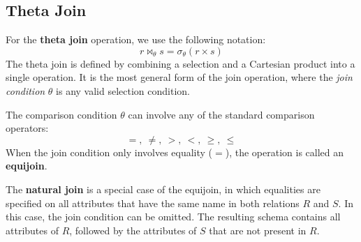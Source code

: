 \subsection{Theta Join}
For the \textbf{theta join} operation, we use the following notation:
\[
  r \Join_{\theta} s = \sigma_{\theta}(r \times s)
\]
The theta join is defined by combining a selection and a Cartesian product into a single operation. It is the most general form of the join operation, where the \emph{join condition} \(\theta\) is any valid selection condition.

The comparison condition \(\theta\) can involve any of the standard comparison operators:
\[
  =, \ \neq, \ >, \ <, \ \geq, \ \leq
\]
When the join condition only involves equality (\(=\)), the operation is called an \textbf{equijoin}. 

The \textbf{natural join} is a special case of the equijoin, in which equalities are specified on all attributes that have the same name in both relations \(R\) and \(S\). In this case, the join condition can be omitted. The resulting schema contains all attributes of \(R\), followed by the attributes of \(S\) that are not present in \(R\).
